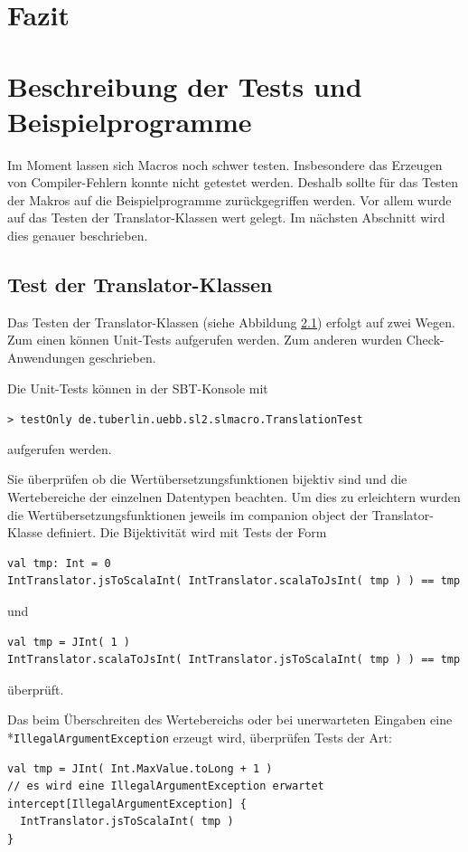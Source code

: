 \documentclass[12pt,bibtotoc]{scrreprt}
\begin{document}
\chapter{Fazit}
\label{chap:conclusion}

\appendix

\chapter{Beschreibung der Tests und Beispielprogramme}
\label{chap:tests-and-examples}

Im Moment lassen sich Macros noch schwer testen. Insbesondere das Erzeugen von Compiler-Fehlern konnte nicht getestet werden. Deshalb sollte für das Testen der Makros auf die Beispielprogramme zurückgegriffen werden.  Vor allem wurde auf das Testen der Translator-Klassen wert gelegt. Im nächsten Abschnitt wird dies genauer beschrieben. 

\section{Test der Translator-Klassen}

Das Testen der Translator-Klassen (siehe Abbildung \ref{}) erfolgt auf zwei Wegen. Zum einen können Unit-Tests aufgerufen werden. Zum anderen wurden Check-Anwendungen geschrieben.

Die Unit-Tests können in der SBT-Konsole mit

\begin{centering}
\lstinline!> testOnly de.tuberlin.uebb.sl2.slmacro.TranslationTest!\\
\end{centering}

aufgerufen werden.

Sie überprüfen ob die Wertübersetzungsfunktionen bijektiv sind und die Wertebereiche der einzelnen Datentypen beachten. Um dies zu erleichtern wurden die Wertübersetzungsfunktionen jeweils im companion object der Translator-Klasse definiert.  Die Bijektivität wird mit Tests der Form 
\begin{lstlisting}
val tmp: Int = 0
IntTranslator.jsToScalaInt( IntTranslator.scalaToJsInt( tmp ) ) == tmp
\end{lstlisting}
und
\begin{lstlisting}
val tmp = JInt( 1 )
IntTranslator.scalaToJsInt( IntTranslator.jsToScalaInt( tmp ) ) == tmp
\end{lstlisting}
überprüft.

Das beim Überschreiten des Wertebereichs oder bei unerwarteten Eingaben eine\\*\lstinline!IllegalArgumentException! erzeugt wird, überprüfen Tests der Art:
\begin{lstlisting}
val tmp = JInt( Int.MaxValue.toLong + 1 )
// es wird eine IllegalArgumentException erwartet
intercept[IllegalArgumentException] { 
  IntTranslator.jsToScalaInt( tmp )
}
\end{lstlisting} 
\end{document}
